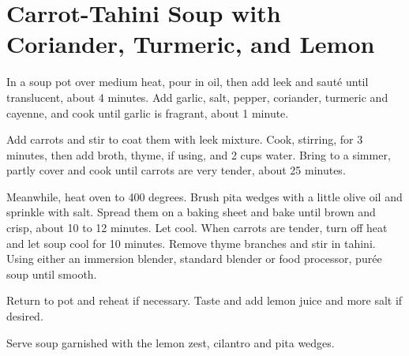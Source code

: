 \section{Carrot-Tahini Soup with Coriander, Turmeric, and Lemon}
\begin{recipe}




In a soup pot over medium heat, pour in oil, then add leek and sauté until translucent, about 4 minutes. Add garlic, salt, pepper, coriander, turmeric and cayenne, and cook until garlic is fragrant, about 1 minute.

Add carrots and stir to coat them with leek mixture. Cook, stirring, for 3 minutes, then add broth, thyme, if using, and 2 cups water. Bring to a simmer, partly cover and cook until carrots are very tender, about 25 minutes.

Meanwhile, heat oven to 400 degrees. Brush pita wedges with a little olive oil and sprinkle with salt. Spread them on a baking sheet and bake until brown and crisp, about 10 to 12 minutes. Let cool.
When carrots are tender, turn off heat and let soup cool for 10 minutes. Remove thyme branches and stir in tahini. Using either an immersion blender, standard blender or food processor, purée soup until smooth.

Return to pot and reheat if necessary. Taste and add lemon juice and more salt if desired.

Serve soup garnished with the lemon zest, cilantro and pita wedges.



\end{recipe}
